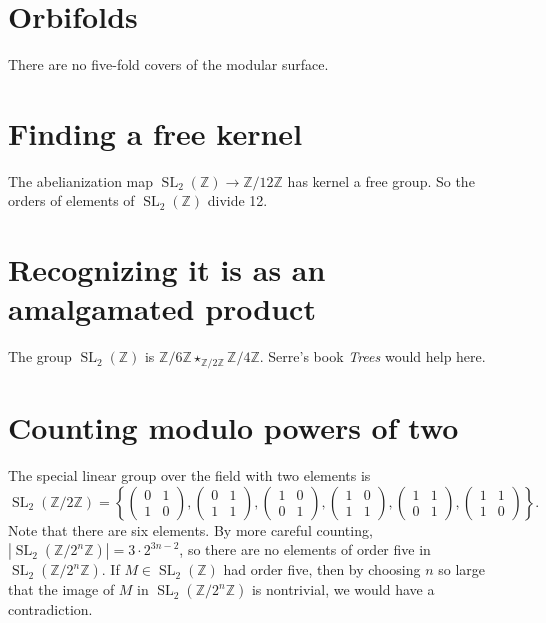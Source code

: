 \documentclass{article}
\DeclareMathOperator{\SL}{SL}
\newcommand{\Z}{\mathbb{Z}}
\begin{document}
\section*{Orbifolds}

There are no five-fold covers of the modular surface.

\section*{Finding a free kernel}

The abelianization map $\SL_2(\Z) \to \Z/12\Z$ has kernel a free
group.  So the orders of elements of $\SL_2(\Z)$ divide 12.

\section*{Recognizing it is as an amalgamated product}

The group $\SL_2(\Z)$ is $\Z/6\Z \star_{\Z/2\Z} \Z/4\Z$.  Serre's book
\textit{Trees} would help here.

\section*{Counting modulo powers of two}

The special linear group over the field with two elements is
$$
\SL_2(\Z/2\Z) = \left\{
\left(\begin{array}{rr}
0 & 1 \\
1 & 0
\end{array}\right), \left(\begin{array}{rr}
0 & 1 \\
1 & 1
\end{array}\right), \left(\begin{array}{rr}
1 & 0 \\
0 & 1
\end{array}\right), \left(\begin{array}{rr}
1 & 0 \\
1 & 1
\end{array}\right), \left(\begin{array}{rr}
1 & 1 \\
0 & 1
\end{array}\right), \left(\begin{array}{rr}
1 & 1 \\
1 & 0
\end{array}\right) \right\}.
$$
Note that there are six elements.  By more careful counting,
$|\SL_2(\Z/2^n \Z)| = 3 \cdot 2^{3n-2}$, so there are no elements of
order five in $\SL_2(\Z/2^n \Z)$.  If $M \in \SL_2(\Z)$ had order
five, then by choosing $n$ so large that the image of $M$ in
$\SL_2(\Z/2^n \Z)$ is nontrivial, we would have a contradiction.
\end{document}
